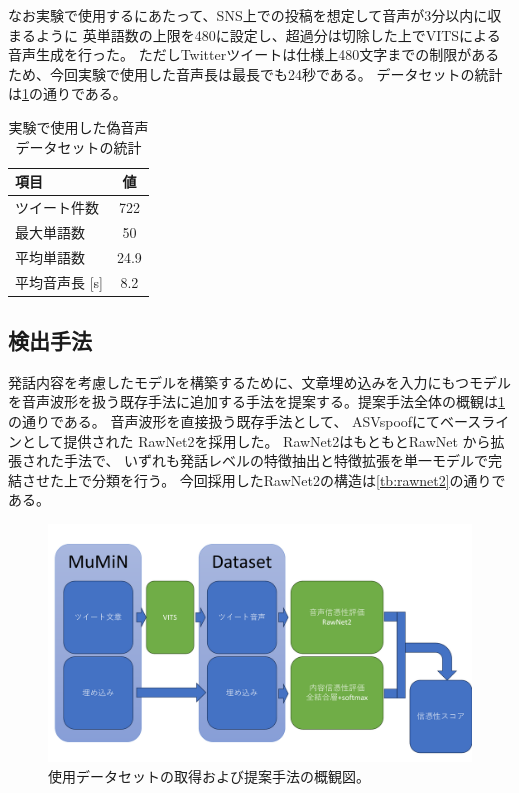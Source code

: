 なお実験で使用するにあたって、SNS上での投稿を想定して音声が3分以内に収まるように
英単語数の上限を480に設定し、超過分は切除した上でVITSによる音声生成を行った。
ただしTwitterツイートは仕様上480文字までの制限があるため、今回実験で使用した音声長は最長でも24秒である。
データセットの統計は\cref{tb:dataset}の通りである。

\begin{table}[h]
    \centering
    \caption{実験で使用した偽音声データセットの統計}
    \begin{tabular}{lc}\hline
        項目 & 値\\\hline\hline
        ツイート件数 & 722\\
        最大単語数 & 50\\
        平均単語数 & 24.9\\
        平均音声長 [\si{s}] & 8.2\\\hline
    \end{tabular}
    \label{tb:dataset}
\end{table}

\subsection{検出手法}
発話内容を考慮したモデルを構築するために、文章埋め込みを入力にもつモデルを音声波形を扱う既存手法に追加する手法を提案する。提案手法全体の概観は\cref{fig:allmodel}の通りである。
音声波形を直接扱う既存手法として、
ASVspoofにてベースラインとして提供された \cite{WANG2020101114}RawNet2を採用した。
RawNet2はもともとRawNet \cite{jung19b_interspeech}から拡張された手法で、
いずれも発話レベルの特徴抽出と特徴拡張を単一モデルで完結させた上で分類を行う。
今回採用したRawNet2の構造は\cref{tb:rawnet2}の通りである。

\begin{figure}[ht]
    \centering
    \includegraphics[width=\textwidth]{./figures/ieice_allFig.pdf}
    \caption{使用データセットの取得および提案手法の概観図。}
    \label{fig:allmodel}
\end{figure}


